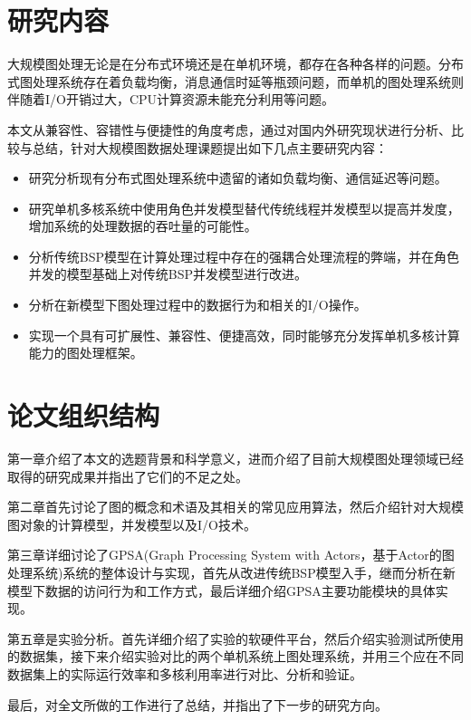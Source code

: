 \section{研究内容}
大规模图处理无论是在分布式环境还是在单机环境，都存在各种各样的问题。分布式图处理系统存在着负载均衡，消息通信时延等瓶颈问题，而单机的图处理系统则伴随着I/O开销过大，CPU计算资源未能充分利用等问题。

本文从兼容性、容错性与便捷性的角度考虑，通过对国内外研究现状进行分析、比较与总结，针对大规模图数据处理课题提出如下几点主要研究内容：
\begin{itemize}
\item 研究分析现有分布式图处理系统中遗留的诸如负载均衡、通信延迟等问题。
\item 研究单机多核系统中使用角色并发模型替代传统线程并发模型以提高并发度，增加系统的处理数据的吞吐量的可能性。
\item 分析传统BSP模型在计算处理过程中存在的强耦合处理流程的弊端，并在角色并发的模型基础上对传统BSP并发模型进行改进。
\item 分析在新模型下图处理过程中的数据行为和相关的I/O操作。
\item 实现一个具有可扩展性、兼容性、便捷高效，同时能够充分发挥单机多核计算能力的图处理框架。
\end{itemize}

\section{论文组织结构}

第一章介绍了本文的选题背景和科学意义，进而介绍了目前大规模图处理领域已经取得的研究成果并指出了它们的不足之处。

第二章首先讨论了图的概念和术语及其相关的常见应用算法，然后介绍针对大规模图对象的计算模型，并发模型以及I/O技术。

第三章详细讨论了GPSA(Graph Processing System with Actors，基于Actor的图处理系统)系统的整体设计与实现，首先从改进传统BSP模型入手，继而分析在新模型下数据的访问行为和工作方式，最后详细介绍GPSA主要功能模块的具体实现。

第五章是实验分析。首先详细介绍了实验的软硬件平台，然后介绍实验测试所使用的数据集，接下来介绍实验对比的两个单机系统上图处理系统，并用三个应在不同数据集上的实际运行效率和多核利用率进行对比、分析和验证。

最后，对全文所做的工作进行了总结，并指出了下一步的研究方向。